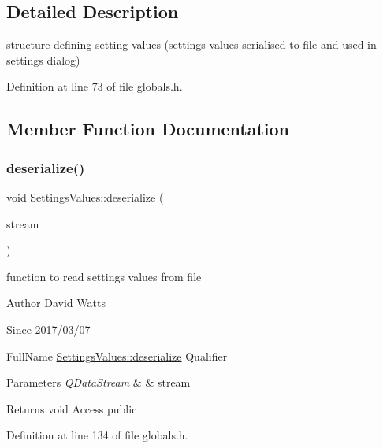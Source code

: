 \subsection{Detailed Description}
structure defining setting values (settings values serialised to file and used in settings dialog) 

Definition at line 73 of file globals.\+h.



\subsection{Member Function Documentation}
\mbox{\label{struct_settings_values_aa8366afce6108e4404af7d6f98ad1368}} 
\subsubsection{\texorpdfstring{deserialize()}{deserialize()}}
{\footnotesize\ttfamily void Settings\+Values\+::deserialize (\begin{DoxyParamCaption}\item[{Q\+Data\+Stream \&}]{stream }\end{DoxyParamCaption})\hspace{0.3cm}{\ttfamily [inline]}}

function to read settings values from file

\begin{DoxyAuthor}{Author}
David Watts 
\end{DoxyAuthor}
\begin{DoxySince}{Since}
2017/03/07
\end{DoxySince}
Full\+Name \hyperlink{struct_settings_values_aa8366afce6108e4404af7d6f98ad1368}{Settings\+Values\+::deserialize} Qualifier 
\begin{DoxyParams}{Parameters}
{\em Q\+Data\+Stream} & \& stream \\
\hline
\end{DoxyParams}
\begin{DoxyReturn}{Returns}
void Access public 
\end{DoxyReturn}


Definition at line 134 of file globals.\+h.

